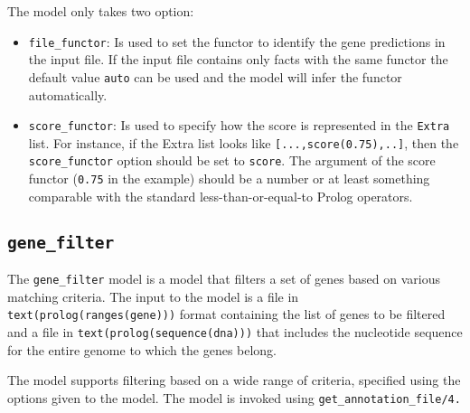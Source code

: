 \documentclass{book}
\begin{document}
The model only takes two option:

\begin{itemize} 
\item \texttt{file\_functor}: Is used to set the functor to
  identify the gene predictions in the input file. If the input file
  contains only facts with the same functor the default value
  \texttt{auto} can be used and the model will infer the functor
  automatically.
\item \texttt{score\_functor}: Is used to specify how the score is
  represented in the \texttt{Extra} list. For instance, if the Extra
  list looks like \verb|[...,score(0.75),..]|,  then the
  \texttt{score\_functor} option should be set to \texttt{score}.
  The argument of the score functor (\texttt{0.75} in the example)
  should be a number or at least something comparable with the
  standard less-than-or-equal-to Prolog operators.
\end{itemize}

\subsection{\texttt{gene\_filter}}

The \texttt{gene\_filter} model is a model that filters a set of genes
based on various matching criteria. The input to the model is 
a file in \texttt{text(prolog(ranges(gene)))} format containing the 
list of genes to be filtered and a file in
\texttt{text(prolog(sequence(dna)))} that includes the nucleotide
sequence for the entire genome to which the genes belong.

The model supports filtering based on a wide range of criteria,
specified using the options given to the model. The model 
is invoked using \texttt{get\_annotation\_file/4.}
\end{document}
